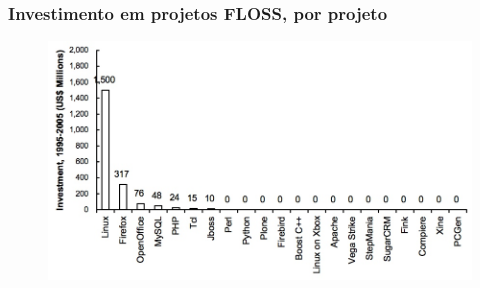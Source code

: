 \documentclass[xcolor=dvipsnames]{beamer}
\begin{document}
\begin{frame}
	\frametitle{Investimento em projetos FLOSS, por projeto}
	\begin{figure}
	\begin{center}
 	\includegraphics[scale=0.75]{investimento.jpg}\\[0.3cm]
	\end{center}
	\end{figure}
\end{frame}
\end{document}
